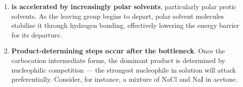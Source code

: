 \documentclass[10pt]{article}
\begin{document}
\begin{core}{\sno}
\begin{enumerate}
      \item \textbf{\sno is accelerated by increasingly polar solvents}, particularly polar protic solvents. As the leaving group begins to depart, polar solvent molecules stabilise it through hydrogen bonding, effectively lowering the energy barrier for its departure.


      \item \textbf{Product-determining steps occur after the bottleneck}. Once the carbocation intermediate forms, the dominant product is determined by nucleophilic competition --- the strongest nucleophile in solution will attack preferentially. Consider, for instance, a mixture of NaCl and NaI in acetone.


\end{enumerate}
\end{core}
\end{document}
